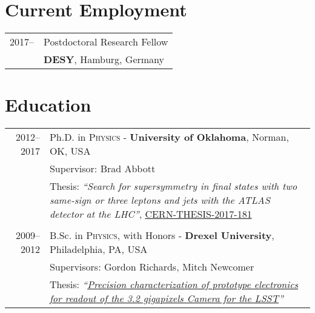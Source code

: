 \documentclass[a4paper,10pt]{article}
\begin{document}
\section{Current Employment}
\begin{tabular}{r|p{15.5cm}}
\textsc{2017--\phantom{0000}}		&	Postdoctoral Research Fellow 	\\
							&		{\bf DESY}, Hamburg, Germany  						\\
\end{tabular}


\vspace{3mm}
\section{Education}

\begin{tabular}{r | p{15.5cm}}
\textsc{2012--2017}			&  Ph.D. in \textsc{Physics} - \textbf{University of Oklahoma}, Norman, OK, USA \\
							& Supervisor: Brad Abbott \\ %
							& Thesis: {\it``Search for supersymmetry in final states with two same-sign or three leptons and jets with the ATLAS detector at the LHC''}, \href{https://cds.cern.ch/record/2289509/files/CERN-THESIS-2017-181.pdf}{CERN-THESIS-2017-181} \\
\multicolumn{2}{c}{} \\
\textsc{2009--2012} 	    & B.Sc. in \textsc{Physics}, with Honors - \textbf{Drexel University}, Philadelphia, PA, USA	\\
							& Supervisors: Gordon Richards, Mitch Newcomer					\\
							& Thesis: \it{``\href{https://www.nhn.ou.edu/~othrif/LSST_Camera_Electronics.pdf}{Precision characterization of prototype electronics for readout of the 3.2 gigapixels Camera for the LSST}''} \\
\end{tabular}
\end{document}
